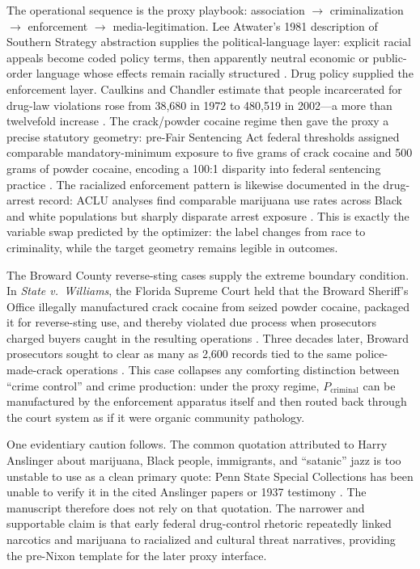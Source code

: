 The operational sequence is the proxy playbook: association $\rightarrow$ criminalization $\rightarrow$ enforcement $\rightarrow$ media-legitimation. Lee Atwater's 1981 description of Southern Strategy abstraction supplies the political-language layer: explicit racial appeals become coded policy terms, then apparently neutral economic or public-order language whose effects remain racially structured \cite{atwater, lopez}. Drug policy supplied the enforcement layer. Caulkins and Chandler estimate that people incarcerated for drug-law violations rose from 38,680 in 1972 to 480,519 in 2002---a more than twelvefold increase \cite{caulkins_chandler_drug_incarceration}. The crack/powder cocaine regime then gave the proxy a precise statutory geometry: pre-Fair Sentencing Act federal thresholds assigned comparable mandatory-minimum exposure to five grams of crack cocaine and 500 grams of powder cocaine, encoding a 100:1 disparity into federal sentencing practice \cite{ussc_crack_retroactivity_2011}. The racialized enforcement pattern is likewise documented in the drug-arrest record: ACLU analyses find comparable marijuana use rates across Black and white populations but sharply disparate arrest exposure \cite{aclu2013, aclu2020}. This is exactly the variable swap predicted by the optimizer: the label changes from race to criminality, while the target geometry remains legible in outcomes.

The Broward County reverse-sting cases supply the extreme boundary condition. In \textit{State v.\ Williams}, the Florida Supreme Court held that the Broward Sheriff's Office illegally manufactured crack cocaine from seized powder cocaine, packaged it for reverse-sting use, and thereby violated due process when prosecutors charged buyers caught in the resulting operations \cite{state_v_williams_1993}. Three decades later, Broward prosecutors sought to clear as many as 2,600 records tied to the same police-made-crack operations \cite{ap_broward_crack_vacatur_2024}. This case collapses any comforting distinction between ``crime control'' and crime production: under the proxy regime, $P_{\text{criminal}}$ can be manufactured by the enforcement apparatus itself and then routed back through the court system as if it were organic community pathology.

One evidentiary caution follows. The common quotation attributed to Harry Anslinger about marijuana, Black people, immigrants, and ``satanic'' jazz is too unstable to use as a clean primary quote: Penn State Special Collections has been unable to verify it in the cited Anslinger papers or 1937 testimony \cite{penn_state_anslinger_quote}. The manuscript therefore does not rely on that quotation. The narrower and supportable claim is that early federal drug-control rhetoric repeatedly linked narcotics and marijuana to racialized and cultural threat narratives, providing the pre-Nixon template for the later proxy interface.

